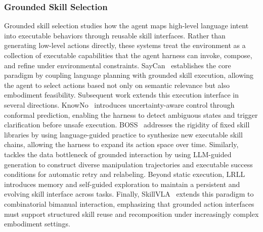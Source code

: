 \subsubsection{Grounded Skill Selection}
Grounded skill selection studies how the agent maps high-level language intent into executable behaviors through reusable skill interfaces. Rather than generating low-level actions directly, these systems treat the environment as a collection of executable capabilities
that the agent harness can invoke, compose, and refine under environmental constraints. SayCan~\cite{ahn2022can} establishes the core paradigm by coupling language planning with grounded skill execution, allowing the agent to select actions based not only on semantic relevance but also embodiment feasibility.
Subsequent work extends this execution interface in several directions. KnowNo~\cite{ren2023robots} introduces uncertainty-aware control through conformal prediction, enabling the harness to detect ambiguous states and trigger clarification before unsafe
execution. BOSS~\cite{zhang2023bootstrap} addresses the rigidity of fixed skill libraries by using language-guided practice to synthesize
new executable skill chains, allowing the harness to expand its
action space over time.
Similarly, \cite{ha2023scaling} tackles the data bottleneck of
grounded interaction by using LLM-guided generation to construct
diverse manipulation trajectories and executable success
conditions for automatic retry and relabeling.
Beyond static execution, LRLL~\cite{tziafas2024lifelong}
introduces memory and self-guided exploration to maintain a
persistent and evolving skill interface across tasks.
Finally, SkillVLA~\cite{zhai2026skillvla} extends this paradigm
to combinatorial bimanual interaction, emphasizing that grounded
action interfaces must support structured skill reuse and
recomposition under increasingly complex embodiment settings.

